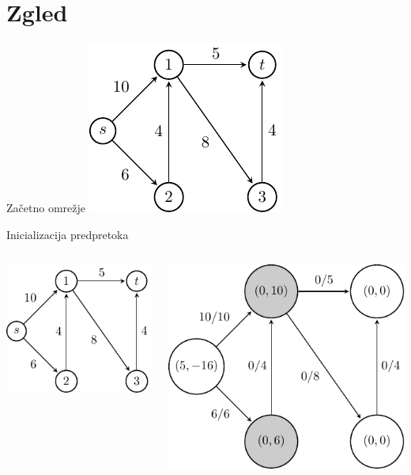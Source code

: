 \documentclass{beamer}
\begin{document}
\section{Zgled}
\begin{frame}{Začetno omrežje}
    \centering
    \includegraphics[scale=1.6]{../writing/images/graf2-1.pdf}
\end{frame}

\begin{frame}{Inicializacija predpretoka}
    \begin{columns}
        \begin{column}{0.5\textwidth}
            \centering
            \includegraphics[scale=1.2]{../writing/images/graf2-1.pdf}
        \end{column}
        \pause
        \begin{column}{0.5\textwidth}
            \centering
            \includegraphics[scale=0.7]{../writing/images/graf2-2.pdf}
        \end{column}
    \end{columns}
\end{frame}
\end{document}
